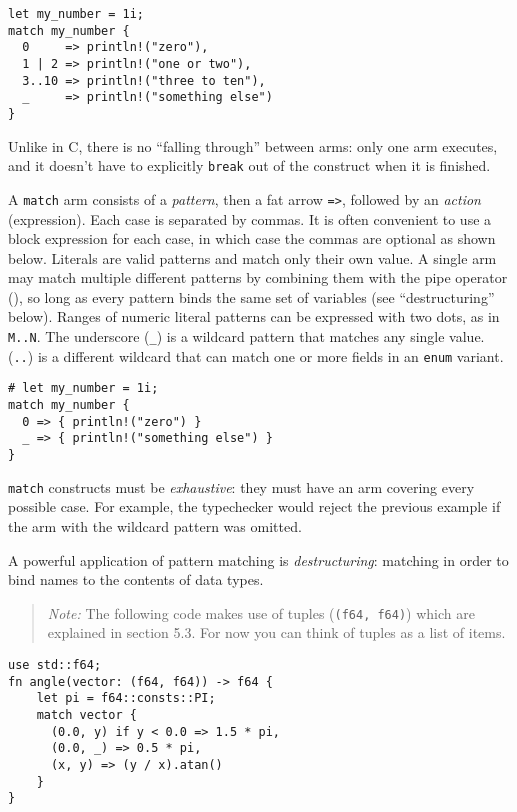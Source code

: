 \documentclass[]{article}
\begin{document}
\begin{verbatim}
let my_number = 1i;
match my_number {
  0     => println!("zero"),
  1 | 2 => println!("one or two"),
  3..10 => println!("three to ten"),
  _     => println!("something else")
}
\end{verbatim}

Unlike in C, there is no ``falling through'' between arms: only one arm
executes, and it doesn't have to explicitly \texttt{break} out of the
construct when it is finished.

A \texttt{match} arm consists of a \emph{pattern}, then a fat arrow
\texttt{=\textgreater{}}, followed by an \emph{action} (expression).
Each case is separated by commas. It is often convenient to use a block
expression for each case, in which case the commas are optional as shown
below. Literals are valid patterns and match only their own value. A
single arm may match multiple different patterns by combining them with
the pipe operator (\texttt{\textbar{}}), so long as every pattern binds
the same set of variables (see ``destructuring'' below). Ranges of
numeric literal patterns can be expressed with two dots, as in
\texttt{M..N}. The underscore (\texttt{\_}) is a wildcard pattern that
matches any single value. (\texttt{..}) is a different wildcard that can
match one or more fields in an \texttt{enum} variant.

\begin{verbatim}
# let my_number = 1i;
match my_number {
  0 => { println!("zero") }
  _ => { println!("something else") }
}
\end{verbatim}

\texttt{match} constructs must be \emph{exhaustive}: they must have an
arm covering every possible case. For example, the typechecker would
reject the previous example if the arm with the wildcard pattern was
omitted.

A powerful application of pattern matching is \emph{destructuring}:
matching in order to bind names to the contents of data types.

\begin{quote}
\emph{Note:} The following code makes use of tuples
(\texttt{(f64, f64)}) which are explained in section 5.3. For now you
can think of tuples as a list of items.
\end{quote}

\begin{verbatim}
use std::f64;
fn angle(vector: (f64, f64)) -> f64 {
    let pi = f64::consts::PI;
    match vector {
      (0.0, y) if y < 0.0 => 1.5 * pi,
      (0.0, _) => 0.5 * pi,
      (x, y) => (y / x).atan()
    }
}
\end{verbatim}
\end{document}
